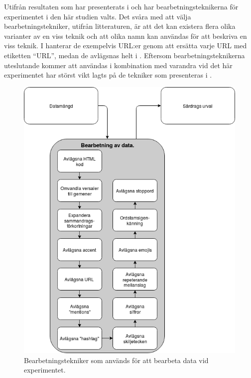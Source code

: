 \documentclass{kaumasters} %
\begin{document}
Utifrån resultaten som har presenterats i \cite{effrosynidis2017comparison} och \cite{7862202} har bearbetningsteknikerna för experimentet i den här studien valts. 
Det svåra med att välja bearbetningstekniker, utifrån litteraturen, är att det kan existera flera olika varianter av en viss teknik och att olika namn kan användas för att beskriva en viss teknik. I \cite{effrosynidis2017comparison} hanterar de exempelvis URL:er genom att ersätta varje URL med etiketten “URL”, medan de avlägsnas helt i \cite{7862202}. Eftersom bearbetningsteknikerna uteslutande kommer att användas i kombination med varandra vid det här experimentet har störst vikt lagts på de tekniker som presenteras i \cite{7862202}.

\begin{figure}[H]
\includegraphics[width=12cm]{dataset}
\centering
\caption{Bearbetningstekniker som används för att bearbeta data vid experimentet.}
\label{fig:dataset}
\end{figure}
\end{document}
